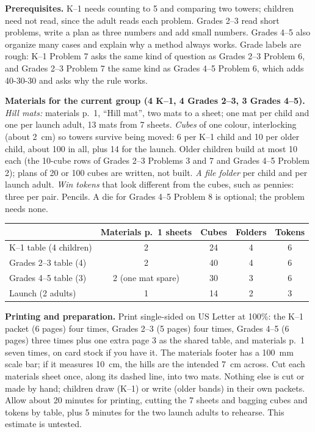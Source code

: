 \documentclass[11pt]{article}
\begin{document}
\textbf{Prerequisites.} K--1 needs counting to 5 and comparing two towers; children need not read, since the adult reads each problem. Grades 2--3 read short problems, write a plan as three numbers and add small numbers. Grades 4--5 also organize many cases and explain why a method always works. Grade labels are rough: K--1 Problem 7 asks the same kind of question as Grades 2--3 Problem 6, and Grades 2--3 Problem 7 the same kind as Grades 4--5 Problem 6, which adds 40-30-30 and asks why the rule works.

\textbf{Materials for the current group (4 K--1, 4 Grades 2--3, 3 Grades 4--5).} \emph{Hill mats:} materials p.~1, ``Hill mat'', two mats to a sheet; one mat per child and one per launch adult, 13 mats from 7 sheets. \emph{Cubes} of one colour, interlocking (about 2~cm) so towers survive being moved: 6 per K--1 child and 10 per older child, about 100 in all, plus 14 for the launch. Older children build at most 10 each (the 10-cube rows of Grades 2--3 Problems 3 and 7 and Grades 4--5 Problem 2); plans of 20 or 100 cubes are written, not built. \emph{A file folder} per child and per launch adult. \emph{Win tokens} that look different from the cubes, such as pennies: three per pair. Pencils. A die for Grades 4--5 Problem 8 is optional; the problem needs none.
\begin{center}\small
\begin{tabular}{@{}lcccc@{}}
\toprule
 & Materials p.~1 sheets & Cubes & Folders & Tokens\\
\midrule
K--1 table (4 children) & 2 & 24 & 4 & 6\\
Grades 2--3 table (4) & 2 & 40 & 4 & 6\\
Grades 4--5 table (3) & 2 (one mat spare) & 30 & 3 & 6\\
Launch (2 adults) & 1 & 14 & 2 & 3\\
\bottomrule
\end{tabular}
\end{center}

\textbf{Printing and preparation.} Print single-sided on US Letter at 100\%: the K--1 packet (6 pages) four times, Grades 2--3 (5 pages) four times, Grades 4--5 (6 pages) three times plus one extra page 3 as the shared table, and materials p.~1 seven times, on card stock if you have it. The materials footer has a 100~mm scale bar; if it measures 10~cm, the hills are the intended 7~cm across. Cut each materials sheet once, along its dashed line, into two mats. Nothing else is cut or made by hand; children draw (K--1) or write (older bands) in their own packets. Allow about 20 minutes for printing, cutting the 7 sheets and bagging cubes and tokens by table, plus 5 minutes for the two launch adults to rehearse. This estimate is untested.
\end{document}
